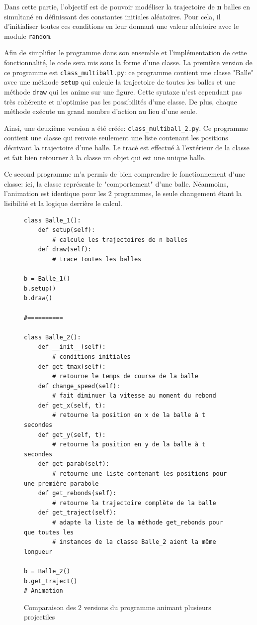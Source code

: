 \documentclass[a4paper,11pt]{article}
\begin{document}
Dans cette partie, l'objectif est de pouvoir modéliser la trajectoire de \textbf{n} balles en simultané en définissant des constantes initiales aléatoires. Pour cela, il d'initialiser toutes ces conditions en leur donnant une valeur aléatoire avec le module \verb|random|.

Afin de simplifier le programme dans son ensemble et l'implémentation de cette fonctionnalité, le code sera mis sous la forme d'une classe. La première version de ce programme est  \verb|class_multiball.py|: ce programme contient une classe "Balle" avec une méthode \verb|setup| qui calcule la trajectoire de toutes les balles et une méthode \verb|draw| qui les anime sur une figure. Cette syntaxe n'est cependant pas très cohérente et n'optimise pas les possibilités d'une classe. De plus, chaque méthode exécute un grand nombre d'action au lieu d'une seule.

Ainsi, une deuxième version a été créée: \verb|class_multiball_2.py|. Ce programme contient une classe qui renvoie seulement une liste contenant les positions décrivant la trajectoire d'une balle. Le tracé est effectué à l'extérieur de la classe et fait bien retourner à la classe un objet qui est une unique balle.

Ce second programme m'a permis de bien comprendre le fonctionnement d'une classe: ici, la classe représente le "comportement" d'une balle. Néanmoins, l'animation est identique pour les 2 programmes, le seule changement étant la lisibilité et la logique derrière le calcul.


\begin{figure}[H]
\centering
\begin{verbatim}
class Balle_1():
    def setup(self):
        # calcule les trajectoires de n balles
    def draw(self):
        # trace toutes les balles

b = Balle_1()
b.setup()
b.draw()

#==========

class Balle_2():
    def __init__(self):
        # conditions initiales
    def get_tmax(self):
        # retourne le temps de course de la balle
    def change_speed(self): 
        # fait diminuer la vitesse au moment du rebond
    def get_x(self, t):  
        # retourne la position en x de la balle à t secondes
    def get_y(self, t):  
        # retourne la position en y de la balle à t secondes
    def get_parab(self): 
        # retourne une liste contenant les positions pour une première parabole
    def get_rebonds(self):  
        # retourne la trajectoire complète de la balle
    def get_traject(self):
        # adapte la liste de la méthode get_rebonds pour que toutes les 
        # instances de la classe Balle_2 aient la même longueur

b = Balle_2()
b.get_traject()
# Animation 
\end{verbatim}
\caption{Comparaison des 2 versions du programme animant plusieurs projectiles}
\end{figure}
\end{document}
